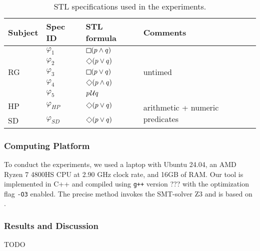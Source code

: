 \begin{table}
\centering
\begin{tabular}{|l|l|l|l|}
\hline
Subject & Spec ID & STL formula & Comments \\
\hline
\multirow{ 5}{*}{RG} & $\varphi_1$ & $\LTLg (p \wedge q)$ & \multirow{ 5}{*}{untimed} \\
& $\varphi_2$ & $\LTLf (p \vee q)$ & \\
& $\varphi_3$ & $\LTLg (p \vee q)$ & \\
& $\varphi_4$ & $\LTLf (p \wedge q)$ & \\
& $\varphi_5$ & $p \kern.1em\mathcal{U} q$ & \\
\hline
HP & $\varphi_{HP}$ & $\LTLf (p \vee q)$ & \multirow{ 2}{*}{arithmetic + numeric predicates} \\
SD & $\varphi_{SD}$ & $\LTLf (p \vee q)$ &  \\
\hline
\end{tabular}
\caption{STL specifications used in the experiments.}
\label{tab:spec} 
\end{table}

\subsubsection{Computing Platform}

To conduct the experiments, we used a laptop with Ubuntu 24.04, an AMD Ryzen 7 4800HS CPU at 2.90 GHz clock rate, and 16GB of RAM.
Our tool is implemented in C++ and compiled using \texttt{g++} \alert{version ???} with the optimization flag \texttt{-O3} enabled.
The precise method invokes the SMT-solver Z3 \cite{MouraB08} and is based on \cite{MomtazAB23}.

\subsubsection{Results and Discussion}
\alert{TODO}
